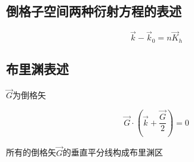 \documentclass{article}
\begin{document}
\begin{multicols}{2}
\subsection{倒格子空间两种衍射方程的表述}

\begin{equation}
  \vec{k} - \vec{k}_0 = n \vec{K}_h
\end{equation}

\subsection{布里渊表述}

$\vec{G}$为倒格矢

\begin{equation}
  \vec{G} \cdot \left( \vec{k} + \frac{\vec{G}}{2} \right) = 0
\end{equation}

所有的倒格矢$\vec{G}$的垂直平分线构成布里渊区

\end{multicols}
\end{document}
